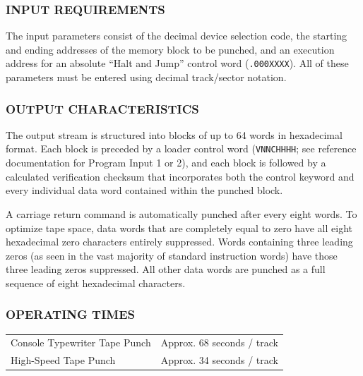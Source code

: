 \subsubsection*{INPUT REQUIREMENTS}
The input parameters consist of the decimal device selection code, the starting and ending addresses of the memory block to be punched, and an execution address for an absolute ``Halt and Jump'' control word (\texttt{.000XXXX}). All of these parameters must be entered using decimal track/sector notation.

\subsubsection*{OUTPUT CHARACTERISTICS}
The output stream is structured into blocks of up to 64 words in hexadecimal format. Each block is preceded by a loader control word (\texttt{VNNCHHHH}; see reference documentation for Program Input 1 or 2), and each block is followed by a calculated verification checksum that incorporates both the control keyword and every individual data word contained within the punched block.

A carriage return command is automatically punched after every eight words. To optimize tape space, data words that are completely equal to zero have all eight hexadecimal zero characters entirely suppressed. Words containing three leading zeros (as seen in the vast majority of standard instruction words) have those three leading zeros suppressed. All other data words are punched as a full sequence of eight hexadecimal characters.

\subsubsection*{OPERATING TIMES}
\begin{center}
\begin{tabular}{ll}
    \toprule
    Console Typewriter Tape Punch & Approx. 68 seconds / track \\
    High-Speed Tape Punch         & Approx. 34 seconds / track \\
    \bottomrule
\end{tabular}
\end{center}

